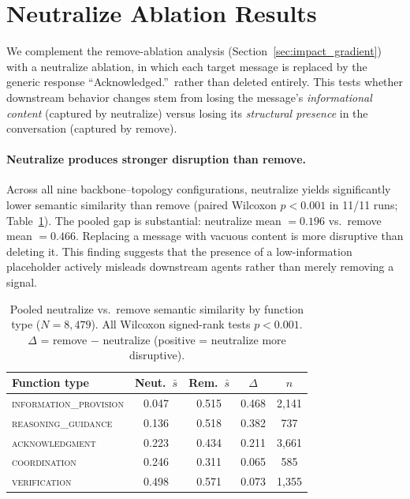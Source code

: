 \section{Neutralize Ablation Results}
\label{app:neutralize-detail}

We complement the remove-ablation analysis (Section~\ref{sec:impact_gradient}) with a neutralize ablation, in which each target message is replaced by the generic response ``Acknowledged.''\ rather than deleted entirely.  This tests whether downstream behavior changes stem from losing the message's \emph{informational content} (captured by neutralize) versus losing its \emph{structural presence} in the conversation (captured by remove).

\paragraph{Neutralize produces stronger disruption than remove.}
Across all nine backbone--topology configurations, neutralize yields significantly lower semantic similarity than remove (paired Wilcoxon $p < 0.001$ in 11/11 runs; Table~\ref{tab:neut_vs_rm}).  The pooled gap is substantial: neutralize mean $= 0.196$ vs.\ remove mean $= 0.466$.  Replacing a message with vacuous content is more disruptive than deleting it. This finding suggests that the presence of a low-information placeholder actively misleads downstream agents rather than merely removing a signal.

\begin{table}[t]
\centering
\caption{Pooled neutralize vs.\ remove semantic similarity by function type ($N = 8{,}479$). All Wilcoxon signed-rank tests $p < 0.001$. $\Delta$ = remove $-$ neutralize (positive = neutralize more disruptive).}
\label{tab:neut_vs_rm}
\small
\begin{tabular}{lcccc}
\toprule
\textbf{Function type} & \textbf{Neut.\ $\bar{s}$} & \textbf{Rem.\ $\bar{s}$} & \textbf{$\Delta$} & $n$ \\
\midrule
\textsc{information\_provision} & 0.047 & 0.515 & 0.468 & 2{,}141 \\
\textsc{reasoning\_guidance}    & 0.136 & 0.518 & 0.382 & 737 \\
\textsc{acknowledgment}         & 0.223 & 0.434 & 0.211 & 3{,}661 \\
\textsc{coordination}           & 0.246 & 0.311 & 0.065 & 585 \\
\textsc{verification}           & 0.498 & 0.571 & 0.073 & 1{,}355 \\
\bottomrule
\end{tabular}
\end{table}

